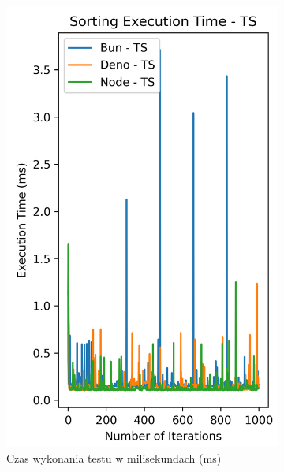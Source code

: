 \begin{figure}[H]
  \centering
  \begin{subfigure}[b]{0.42\textwidth}
    \centering
    \includegraphics[width=\textwidth]{Figures/sorting/sorting_radix_1000_1000_ts_time.png}
    \caption{Czas wykonania testu w milisekundach (ms)}
    \label{fig:radix_sorting_e2_ts_time}
  \end{subfigure}
  \begin{subfigure}[b]{0.42\textwidth}
    \centering

\end{subfigure}
\end{figure}
